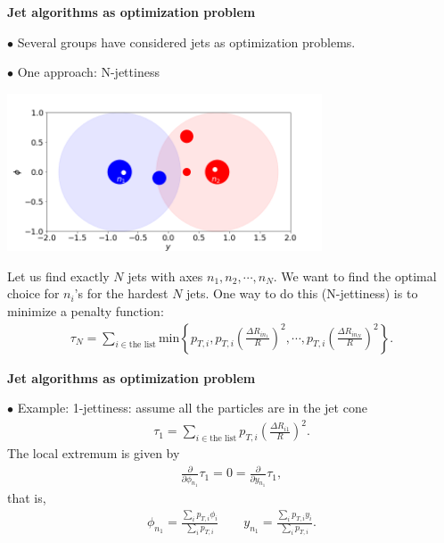 \documentclass[9pt,a4paper,unknownkeysallowed,xcolor=dvipsnames,aspectratio=43]{beamer}
\begin{document}
\begin{frame}{\bf\huge Jet algorithms as optimization problem}\vspace{2mm}

{\color{darkred}\Large$\bullet$} {Several groups have considered jets as optimization problems.} \\
\vspace{2mm}

{\color{darkred}\Large$\bullet$} One approach: {\color{darkred} N-jettiness} \\
\vspace{2mm}
\begin{center}
\includegraphics[width=0.7\textwidth]{03/njittiness.png}
\end{center}
Let us find exactly $N$ jets with axes $n_1, n_2, \cdots, n_N$. We want to find the optimal choice for $n_i$'s for the hardest $N$ jets. One way to do this (N-jettiness) is to minimize a penalty function:
\begin{align}
\tau_N =\sum\limits_{i\in\text{the list}}\text{min}\left\{p_{T,i }, p_{T,i } \left(\frac{\Delta R_{i n_1}}{R}\right)^2, \cdots, p_{T, i} \left(\frac{\Delta R_{i n_N}}{R}\right)^2 
\right\}.
\end{align}
\end{frame}
%
%
\begin{frame}{\bf\huge Jet algorithms as optimization problem}\vspace{2mm}

{\color{darkred}\Large$\bullet$} {Example: 1-jettiness: assume all the particles are in the jet cone} \\
\vspace{2mm}
\begin{align}
    \tau_1 = \sum\limits_{i\in\text{the list}} p_{T, i} \left(\frac{\Delta R_{i1}}{R}\right)^2.
\end{align}
The local extremum is given by
\begin{align}
    \frac{\partial}{\partial \phi_{n_1}}\tau_1 = 0 = \frac{\partial}{\partial y_{n_1}}\tau_1,
\end{align}
that is,
\begin{align}
\phi_{n_1} = \frac{\sum\limits_i p_{T, i} \phi_i}{\sum\limits_i p_{T, i}}\qquad y_{n_1} = \frac{\sum\limits_i p_{T, i} y_i}{\sum\limits_i p_{T, i}}.
\end{align}

\end{frame}
\end{document}
